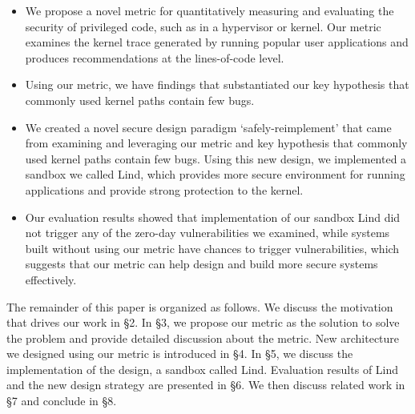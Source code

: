 \begin{itemize}
\item We propose a novel metric for quantitatively measuring and evaluating 
the security of privileged code, such as in a hypervisor or kernel. 
Our metric examines the kernel trace generated by running popular user 
applications and produces recommendations at the lines-of-code level.  

\item Using our metric, we have findings that substantiated our key hypothesis that commonly used kernel paths 
contain few bugs.  

\item We created a novel secure design paradigm `safely-reimplement' that 
came from examining and leveraging our metric and key hypothesis 
that commonly used kernel paths contain few bugs.  
Using this new design, we implemented a sandbox we called Lind, which provides more secure environment
for running applications and provide strong protection to the kernel. 

\item Our evaluation results showed that implementation of our sandbox Lind did not trigger any of the 
zero-day vulnerabilities we examined, 
while systems built without using our metric have chances to trigger
vulnerabilities, which suggests 
that our metric can help design and build more secure systems effectively.
\end{itemize}

The remainder of this paper is organized as follows. 
We discuss the motivation that drives our work in \S{2}. 
In \S{3}, we propose our metric as the solution to solve the problem and provide detailed discussion about the metric.
New architecture we designed using our metric is introduced in \S{4}. In \S{5}, we discuss the implementation of the design, a sandbox called Lind. 
Evaluation results of Lind and the new design strategy are presented in \S{6}. 
We then discuss related work in \S{7} and conclude in \S{8}. 
